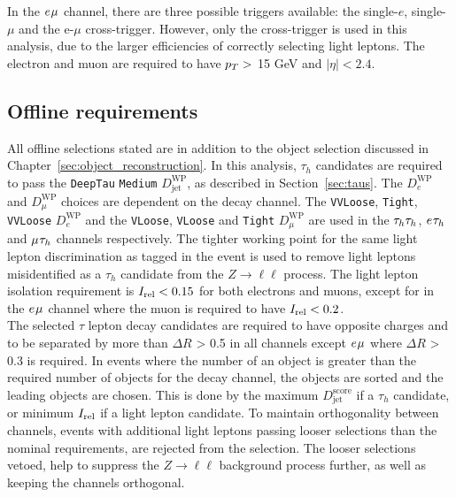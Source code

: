 In the $e_{}\mu_{}$ channel, there are three possible triggers available: the single-$e$, single-$\mu$ and the e-$\mu$ cross-trigger.
However, only the cross-trigger is used in this analysis, due to the larger efficiencies of correctly selecting light leptons.
The electron and muon are required to have $p_{T} >$ 15 GeV and $|\eta| < 2.4$.

\subsection{Offline requirements}

All offline selections stated are in addition to the object selection discussed in Chapter~\ref{sec:object_reconstruction}.
In this analysis, $\tau_h$ candidates are required to pass the \texttt{DeepTau} \texttt{Medium} $D_{\text{jet}}^{\text{WP}}$, as described in Section~\ref{sec:taus}.
The $D_{e}^{\text{WP}}$ and $D_{\mu}^{\text{WP}}$ choices are dependent on the decay channel.
The \texttt{VVLoose}, \texttt{Tight}, \texttt{VVLoose} $D_{e}^{\text{WP}}$ and the \texttt{VLoose}, \texttt{VLoose} and \texttt{Tight} $D_{\mu}^{\text{WP}}$ are used in the $\tau_{h}\tau_{h}$, $e_{}\tau_{h}$ and $\mu_{}\tau_{h}$ channels respectively.
The tighter working point for the same light lepton discrimination as tagged in the event is used to remove light leptons misidentified as a $\tau_h$ candidate from the $Z \rightarrow \ell\ell$ process.
The light lepton isolation requirement is $I_{\text{rel}} < 0.15$ for both electrons and muons, except for in the $e_{}\mu_{}$ channel where the muon is required to have $I_{\text{rel}} < 0.2$. \\

The selected $\tau$ lepton decay candidates are required to have opposite charges and to be separated by more than $\Delta R$ > 0.5 in all channels except $e_{}\mu_{}$ where $\Delta R$ > 0.3 is required.
In events where the number of an object is greater than the required number of objects for the decay channel, the objects are sorted and the leading objects are chosen.
This is done by the maximum $D_{\text{jet}}^{\text{score}}$ if a $\tau_h$ candidate, or minimum $I_{\text{rel}}$ if a light lepton candidate.
To maintain orthogonality between channels, events with additional light leptons passing looser selections than the nominal requirements, are rejected from the selection.
The looser selections vetoed, help to suppress the $Z \rightarrow \ell\ell$ background process further, as well as keeping the channels orthogonal. \\

